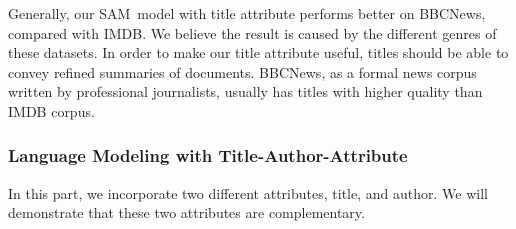 \documentclass[a4paper]{article}
\newcommand{\method}{\xspace{SAM}}
\begin{document}
Generally, our \method~model with title attribute performs better on BBCNews, compared with IMDB. We believe the result is caused by the different genres of these datasets.
In order to make our title attribute useful, titles should be able to convey refined summaries of documents. BBCNews, as a formal news corpus written by professional journalists, usually has titles with higher quality than IMDB corpus. %



\subsubsection{Language Modeling with Title-Author-Attribute}

In this part, we incorporate two different attributes, title, and author. We will demonstrate that these two attributes are complementary.
\end{document}
